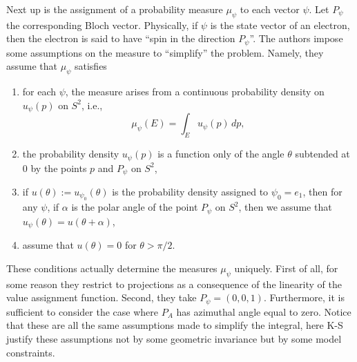 \documentclass[12pt,draft]{article}
\theoremstyle{definition}
\theoremstyle{plain}
\begin{document}
    Next up is the assignment of a probability measure
    $\mu_\psi$ to each vector $\psi$. Let $P_\psi$ the
    corresponding Bloch vector. Physically, if $\psi$ is the
    state vector of an electron, then the electron is said
    to have ``spin in the direction $P_\psi$''. The authors
    impose some assumptions on the measure to ``simplify''
    the problem. Namely, they assume that $\mu_\psi$ 
    satisfies
    \begin{enumerate}
        \item for each $\psi$, the measure arises from a
            continuous probability density on $u_\psi(p)$ on
            $S^2$, i.e., 
            \begin{equation}
                \mu_\psi(E)
                = \int_{E} u_\psi(p) \, dp,
            \end{equation}
        \item the probability density $u_\psi(p)$ is a
            function only of the angle $\theta$ subtended at
            $0$ by the points $p$ and $P_\psi$ on $S^2$,
        \item if $u(\theta) := u_{\psi_0}(\theta)$ is the
            probability density assigned to $\psi_0 = e_1$,
            then for any $\psi$, if $\alpha$ is the polar
            angle of the point $P_\psi$ on $S^2$, then we
            assume that $u_\psi(\theta) = u(\theta +
            \alpha)$,
        \item assume that $u(\theta) = 0$ for $\theta > \pi
            / 2$.
    \end{enumerate}
    These conditions actually determine the measures
    $\mu_\psi$ uniquely. First of all, for some reason they
    restrict to projections as a consequence of the
    linearity of the value assignment function. Second, they
    take $P_\psi = (0,0,1)$. Furthermore, it is sufficient
    to consider the case where $P_A$ has azimuthal angle
    equal to zero. {\color{blue} Notice that these are all
        the same assumptions made to simplify the integral,
        here K-S justify these assumptions not by some
    geometric invariance but by some model constraints.} 
\end{document}
